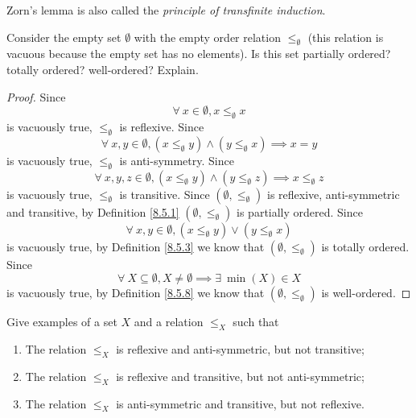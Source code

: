 \begin{note}
    Zorn's lemma is also called the \emph{principle of transfinite induction}.
\end{note}

\exercisesection

\begin{exercise}\label{ex 8.5.1}
    Consider the empty set \(\emptyset\) with the empty order relation \(\leq_\emptyset\)
    (this relation is vacuous because the empty set has no elements).
    Is this set partially ordered? totally ordered? well-ordered? Explain.
\end{exercise}

\begin{proof}
    Since
    \[
        \forall\ x \in \emptyset, x \leq_{\emptyset} x
    \]
    is vacuously true, \(\leq_{\emptyset}\) is reflexive.
    Since
    \[
        \forall\ x, y \in \emptyset, (x \leq_{\emptyset} y) \land (y \leq_{\emptyset} x) \implies x = y
    \]
    is vacuously true, \(\leq_{\emptyset}\) is anti-symmetry.
    Since
    \[
        \forall\ x, y, z \in \emptyset, (x \leq_{\emptyset} y) \land (y \leq_{\emptyset} z) \implies x \leq_{\emptyset} z
    \]
    is vacuously true, \(\leq_{\emptyset}\) is transitive.
    Since \((\emptyset, \leq_{\emptyset})\) is reflexive, anti-symmetric and transitive, by Definition \ref{8.5.1} \((\emptyset, \leq_{\emptyset})\) is partially ordered.
    Since
    \[
        \forall\ x, y \in \emptyset, (x \leq_{\emptyset} y) \lor (y \leq_{\emptyset} x)
    \]
    is vacuously true, by Definition \ref{8.5.3} we know that \((\emptyset, \leq_{\emptyset})\) is totally ordered.
    Since
    \[
        \forall\ X \subseteq \emptyset, X \neq \emptyset \implies \exists\ \min(X) \in X
    \]
    is vacuously true, by Definition \ref{8.5.8} we know that \((\emptyset, \leq_{\emptyset})\) is well-ordered.
\end{proof}

\begin{exercise}\label{ex 8.5.2}
    Give examples of a set \(X\) and a relation \(\leq_X\) such that
    \begin{enumerate}
        \item The relation \(\leq_X\) is reflexive and anti-symmetric, but not transitive;
        \item The relation \(\leq_X\) is reflexive and transitive, but not anti-symmetric;
        \item The relation \(\leq_X\) is anti-symmetric and transitive, but not reflexive.
    \end{enumerate}
\end{exercise}

